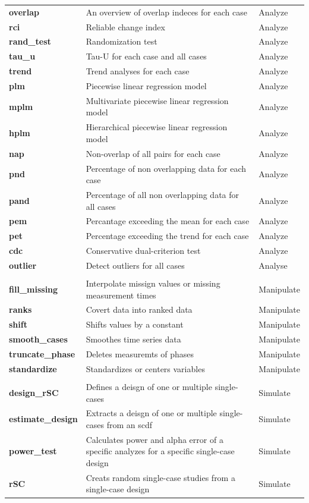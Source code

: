 \documentclass[
]{book}
\begin{document}
\begin{table}
\begin{tabular}[t]{>{\raggedright\arraybackslash}p{15em}>{\raggedright\arraybackslash}p{30em}l}
\textbf{overlap} & An overview of overlap indeces for each case & Analyze\\
\textbf{rci} & Reliable change index & Analyze\\
\textbf{rand\_test} & Randomization test & Analyze\\
\textbf{tau\_u} & Tau-U for each case and all cases & Analyze\\
\textbf{trend} & Trend analyses for each case & Analyze\\
\textbf{plm} & Piecewise linear regression model & Analyze\\
\textbf{mplm} & Multivariate piecewise linear regression model & Analyze\\
\textbf{hplm} & Hierarchical piecewise linear regression model & Analyze\\
\textbf{nap} & Non-overlap of all pairs for each case & Analyze\\
\textbf{pnd} & Percentage of non overlapping data for each case & Analyze\\
\textbf{pand} & Percentage of all non overlapping data for all cases & Analyze\\
\textbf{pem} & Percantage exceeding the mean for each case & Analyze\\
\textbf{pet} & Percentage exceeding the trend for each case & Analyze\\
\textbf{cdc} & Conservative dual-criterion test & Analyze\\
\textbf{outlier} & Detect outliers for all cases & Analyse\\
\textbf{} &  \vphantom{1} & \\
\textbf{fill\_missing} & Interpolate missign values or missing measurement times & Manipulate\\
\textbf{ranks} & Covert data into ranked data & Manipulate\\
\textbf{shift} & Shifts values by a constant & Manipulate\\
\textbf{smooth\_cases} & Smoothes time series data & Manipulate\\
\textbf{truncate\_phase} & Deletes measuremts of phases & Manipulate\\
\textbf{standardize} & Standardizes or centers variables & Manipulate\\
\textbf{} &  & \\
\textbf{design\_rSC} & Defines a deisgn of one or multiple single-cases & Simulate\\
\textbf{estimate\_design} & Extracts a deisgn of one or multiple single-cases from an scdf & Simulate\\
\textbf{power\_test} & Calculates power and alpha error of a specific analyzes for a specific single-case design & Simulate\\
\textbf{rSC} & Creats random single-case studies from a single-case design & Simulate\\
\bottomrule
\end{tabular}
\end{table}
\end{document}
